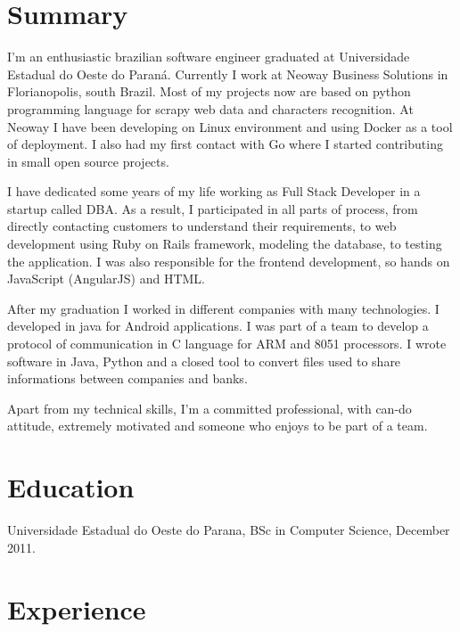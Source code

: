 \documentclass[margin]{res}
\begin{document}
  

\address{Brazil, BR \\ cadicallegari@gmail.com \\ Phone: +55 (48) 9826 4067}
                           
                        
\begin{resume}                        
 
\section{Summary}       I’m an enthusiastic brazilian software engineer graduated at Universidade Estadual do Oeste do Paraná. Currently I work at Neoway Business Solutions in Florianopolis, south Brazil. Most of my projects now are based on python programming language for scrapy web data and characters recognition. At Neoway I have been developing on Linux environment and using Docker as a tool of deployment. I also had my first contact with Go where I started contributing in small open source projects.

I have dedicated some years of my life working as Full Stack Developer in a startup called DBA. As a result, I participated in all parts of process, from directly contacting customers to understand their requirements, to web development using Ruby on Rails framework, modeling the database, to testing the application. I was also responsible for the frontend development, so hands on JavaScript (AngularJS) and HTML.

After my graduation I worked in different companies with many technologies. I developed in java for Android applications. I was part of a team to develop a protocol of communication in C language for ARM and 8051 processors. I wrote software in Java, Python and a closed tool to convert files used to share informations between companies and banks.

Apart from my technical skills, I'm a committed professional, with can-do attitude, extremely motivated and someone who enjoys to be part of a team. 
                        
 
\section{Education} Universidade Estadual do Oeste do Parana, BSc in Computer Science, December 2011.
  
\section{Experience}



\end{resume}
\end{document}
